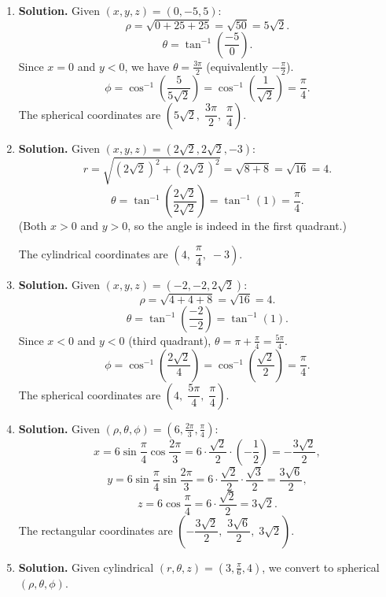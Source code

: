 \begin{enumerate}
\item \textbf{Solution.}
Given \( (x, y, z) = (0, -5, 5) \):
\[
\rho = \sqrt{0 + 25 + 25} = \sqrt{50} = 5\sqrt{2}.
\]
\[
\theta = \tan^{-1}\!\left(\frac{-5}{0}\right).
\]
Since \( x = 0 \) and \( y < 0 \), we have \( \theta = \frac{3\pi}{2} \) (equivalently \( -\frac{\pi}{2} \)).
\[
\phi = \cos^{-1}\!\left(\frac{5}{5\sqrt{2}}\right) = \cos^{-1}\!\left(\frac{1}{\sqrt{2}}\right) = \frac{\pi}{4}.
\]
The spherical coordinates are \( \left(5\sqrt{2},\; \dfrac{3\pi}{2},\; \dfrac{\pi}{4}\right) \).

\item \textbf{Solution.}
Given \( (x, y, z) = (2\sqrt{2}, 2\sqrt{2}, -3) \):
\[
r = \sqrt{(2\sqrt{2})^2 + (2\sqrt{2})^2} = \sqrt{8 + 8} = \sqrt{16} = 4.
\]
\[
\theta = \tan^{-1}\!\left(\frac{2\sqrt{2}}{2\sqrt{2}}\right) = \tan^{-1}(1) = \frac{\pi}{4}.
\]
(Both \( x > 0 \) and \( y > 0 \), so the angle is indeed in the first quadrant.)

The cylindrical coordinates are \( \left(4,\; \dfrac{\pi}{4},\; -3\right) \).

\item \textbf{Solution.}
Given \( (x, y, z) = (-2, -2, 2\sqrt{2}) \):
\[
\rho = \sqrt{4 + 4 + 8} = \sqrt{16} = 4.
\]
\[
\theta = \tan^{-1}\!\left(\frac{-2}{-2}\right) = \tan^{-1}(1).
\]
Since \( x < 0 \) and \( y < 0 \) (third quadrant), \( \theta = \pi + \frac{\pi}{4} = \frac{5\pi}{4} \).
\[
\phi = \cos^{-1}\!\left(\frac{2\sqrt{2}}{4}\right) = \cos^{-1}\!\left(\frac{\sqrt{2}}{2}\right) = \frac{\pi}{4}.
\]
The spherical coordinates are \( \left(4,\; \dfrac{5\pi}{4},\; \dfrac{\pi}{4}\right) \).

\item \textbf{Solution.}
Given \( (\rho, \theta, \phi) = \left(6, \frac{2\pi}{3}, \frac{\pi}{4}\right) \):
\[
x = 6\sin\frac{\pi}{4}\cos\frac{2\pi}{3} = 6 \cdot \frac{\sqrt{2}}{2} \cdot \left(-\frac{1}{2}\right) = -\frac{3\sqrt{2}}{2},
\]
\[
y = 6\sin\frac{\pi}{4}\sin\frac{2\pi}{3} = 6 \cdot \frac{\sqrt{2}}{2} \cdot \frac{\sqrt{3}}{2} = \frac{3\sqrt{6}}{2},
\]
\[
z = 6\cos\frac{\pi}{4} = 6 \cdot \frac{\sqrt{2}}{2} = 3\sqrt{2}.
\]
The rectangular coordinates are \( \left(-\dfrac{3\sqrt{2}}{2},\; \dfrac{3\sqrt{6}}{2},\; 3\sqrt{2}\right) \).

\item \textbf{Solution.}
Given cylindrical \( (r, \theta, z) = \left(3, \frac{\pi}{6}, 4\right) \), we convert to spherical \( (\rho, \theta, \phi) \).


\end{enumerate}
